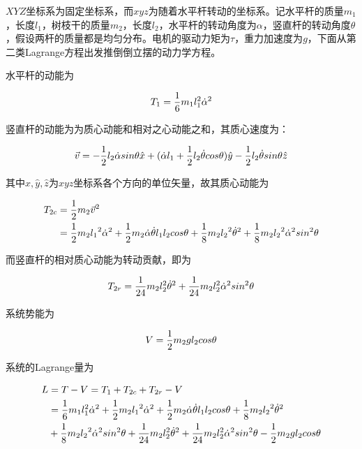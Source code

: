 \documentclass[UTF8]{ctexart}
\begin{document}
$XYZ$坐标系为固定坐标系，而$xyz$为随着水平杆转动的坐标系。记水平杆的质量$m_1$，长度$l_1$，树枝干的质量$m_2$，长度$l_2$，水平杆的转动角度为$\alpha$，竖直杆的转动角度$\theta$，假设两杆的质量都是均匀分布。电机的驱动力矩为$\tau$，重力加速度为$g$，下面从第二类Lagrange方程出发推倒倒立摆的动力学方程。

水平杆的动能为

\begin{equation}
    T_1 = \frac{1}{6} m_1 l_1^2 {\dot{\alpha}}^2
\end{equation}

竖直杆的动能为为质心动能和相对之心动能之和，其质心速度为：

\begin{equation}
    \vec v = -\frac{1}{2} l_2 \dot{\alpha} sin \theta \hat x
    +(\dot{\alpha} l_1+\frac{1}{2} l_2 \dot{\theta} cos \theta )\hat y
    - \frac{1}{2} l_2 \dot{\theta} sin \theta \hat z 
\end{equation}

其中$\hat{x},\hat{y},\hat{z}$为$xyz$坐标系各个方向的单位矢量，故其质心动能为

\begin{equation}
    \begin{aligned}
    T_{2c} &= \frac{1}{2} m_2 \vec v^2\\ 
    &= \frac{1}{2} m_2 {l_1}^2 {\dot{\alpha}}^2
    +\frac{1}{2} m_2 \dot{\alpha} \dot{\theta} l_1 l_2 cos \theta
    +\frac{1}{8} m_2 {l_2}^2 {\dot{\theta}}^2
    +\frac{1}{8} m_2 {l_2}^2 {\dot{\alpha}}^2 sin^2 \theta
    \end{aligned}
\end{equation}

而竖直杆的相对质心动能为转动贡献，即为

\begin{equation}
    T_{2r} = \frac{1}{24} m_2 l_2^2 {\dot{\theta}}^2+ \frac{1}{24} m_2 l_2^2 {\dot{\alpha}}^2 sin^2 \theta
\end{equation}

系统势能为

\begin{equation}
    V = \frac{1}{2} m_2 g l_2 cos \theta
\end{equation}

系统的Lagrange量为

\begin{equation}
    \begin{aligned}
        L &= T - V = T_1 + T_{2c} + T_{2r} - V\\
        &= \frac{1}{6} m_1 l_1^2 {\dot{\alpha}}^2
        +\frac{1}{2} m_2 {l_1}^2 {\dot{\alpha}}^2
        +\frac{1}{2} m_2 \dot{\alpha} \dot{\theta} l_1 l_2 cos \theta
        +\frac{1}{8} m_2 {l_2}^2 {\dot{\theta}}^2\\
        &+\frac{1}{8} m_2 {l_2}^2 {\dot{\alpha}}^2 sin^2 \theta
        +\frac{1}{24} m_2 l_2^2 {\dot{\theta}}^2
        + \frac{1}{24} m_2 l_2^2 {\dot{\alpha}}^2 sin^2 \theta
        -\frac{1}{2} m_2 g l_2 cos \theta
    \end{aligned}
\end{equation}
\end{document}
